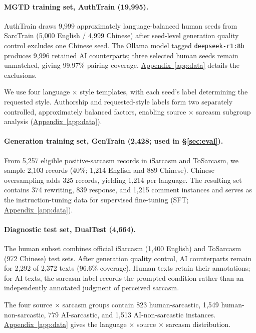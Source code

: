 \documentclass[11pt]{article}
\newcommand{\Sref}[1]{\hyperref[#1]{\S\ref*{#1}}}
\newcommand{\Appref}[1]{\hyperref[#1]{Appendix~\ref*{#1}}}
\begin{document}
\paragraph{MGTD training set, AuthTrain (19{,}995).} AuthTrain draws 9{,}999 approximately language-balanced human seeds from SarcTrain (5{,}000 English / 4{,}999 Chinese) after seed-level generation quality control excludes one Chinese seed. The Ollama model tagged \texttt{deepseek-r1:8b} \citep{deepseek2025r1,ollama2025deepseek8b} produces 9{,}996 retained AI counterparts; three selected human seeds remain unmatched, giving 99.97\% pairing coverage. \Appref{app:data} details the exclusions.

We use four language $\times$ style templates, with each seed's label determining the requested style. Authorship and requested-style labels form two separately controlled, approximately balanced factors, enabling source $\times$ sarcasm subgroup analysis (\Appref{app:data}).

\paragraph{Generation training set, GenTrain (2{,}428; used in \Sref{sec:eval}).} From 5{,}257 eligible positive-sarcasm records in iSarcasm and ToSarcasm, we sample 2{,}103 records (40\%; 1{,}214 English and 889 Chinese). Chinese oversampling adds 325 records, yielding 1{,}214 per language. The resulting set contains 374 rewriting, 839 response, and 1{,}215 comment instances and serves as the instruction-tuning data for supervised fine-tuning (SFT; \Appref{app:data}).

\paragraph{Diagnostic test set, DualTest (4{,}664).} The human subset combines official iSarcasm (1{,}400 English) and ToSarcasm (972 Chinese) test sets. After generation quality control, AI counterparts remain for 2{,}292 of 2{,}372 texts (96.6\% coverage). Human texts retain their annotations; for AI texts, the sarcasm label records the prompted condition rather than an independently annotated judgment of perceived sarcasm.

The four source $\times$ sarcasm groups contain 823 human-sarcastic, 1{,}549 human-non-sarcastic, 779 AI-sarcastic, and 1{,}513 AI-non-sarcastic instances. \Appref{app:data} gives the language $\times$ source $\times$ sarcasm distribution.
\end{document}
